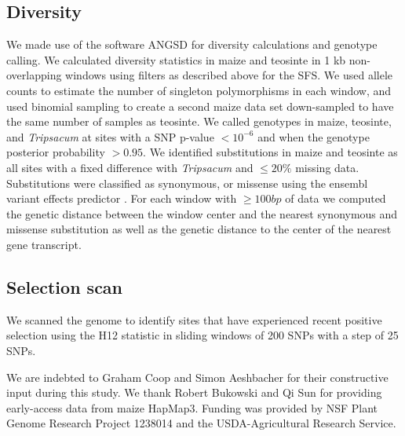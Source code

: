 \documentclass{pnastwo}
\begin{document}
\begin{article}
\begin{materials}
\subsection{Diversity}
We made use of the software ANGSD \cite{korneliussen2014} for diversity calculations and genotype calling. 
We calculated diversity statistics in maize and teosinte in 1 kb non-overlapping windows using filters as described above for the SFS. 
We used allele counts to estimate the number of singleton polymorphisms in each window, and used binomial sampling to create a second maize data set down-sampled to have the same number of samples as teosinte.
We called genotypes in maize, teosinte, and \textit{ Tripsacum} at sites with a SNP p-value $<10^{-6}$ and when the genotype posterior probability $>0.95$. 
We identified substitutions in maize and teosinte as all sites with a fixed difference with \textit{Tripsacum} and $\leq 20\%$ missing data. 
Substitutions were classified as synonymous, or missense using the ensembl variant effects predictor \cite{mclaren2010}.
For each window with $\geq 100bp$ of data we computed the genetic distance between the window center and the nearest synonymous and missense substitution as well as the genetic distance to the center of the nearest gene transcript.  

\subsection{Selection scan}
We scanned the genome to identify sites that have experienced recent positive selection using the H12 statistic \cite{garud2015} in sliding windows of 200 SNPs with a step of 25 SNPs.

\end{materials}

\begin{acknowledgments}
We are indebted to Graham Coop and Simon Aeshbacher for their constructive input during this study. We thank Robert Bukowski and Qi Sun for providing early-access data from maize HapMap3. Funding was provided by NSF Plant Genome Research Project 1238014 and the USDA-Agricultural Research Service.
\end{acknowledgments}




\onecolumn
 


\end{article}
\end{document}
